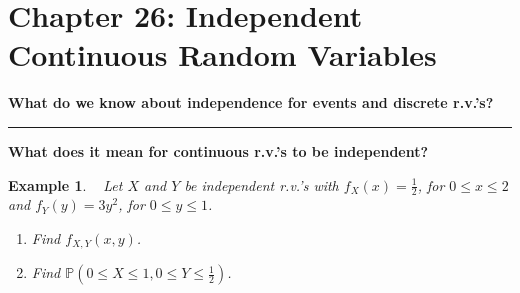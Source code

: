 \documentclass[12pt]{amsart}
\newtheorem{example}[theorem]{Example}
\newcommand\Pbb{\mathbb{P}}
\newcommand\pdfX{f_X(x)}
\newcommand\pdfY{f_Y(y)}
\newcommand\pdfXY{f_{X,Y}(x,y)}
\begin{document}
\setcounter{section}{26}
{\huge  
\section*{Chapter 26: Independent Continuous Random Variables}
}

{\large %




\vspace{.5cm}


\textbf{What do we know about independence for events and discrete r.v.'s?}

\vspace{5cm}
\hrule
\vspace{.5cm}


\textbf{What does it mean for continuous r.v.'s to be independent?}



\newpage

\begin{example}\ %
Let $X$ and $Y$ be independent r.v.'s with $\pdfX = \frac12$, for $0 \leq x \leq 2$ and $\pdfY = 3y^2$, for $0 \leq y \leq 1$.

\vspace{.5cm}

\begin{enumerate}
\item Find $\pdfXY$.
\vspace{7cm}



\item Find $\Pbb(0 \leq X \leq 1, 0 \leq Y \leq \frac12)$.
\vspace{6cm}


\end{enumerate}
\end{example}}
\end{document}
